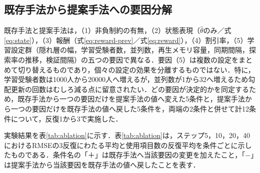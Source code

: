 \documentclass[paper]{ieicej}
\begin{document}
\subsection{既存手法から提案手法への要因分解}\label{sec:ablation}

既存手法と提案手法は，（1）非負制約の有無，（2）状態表現（$\hat\theta$のみ／式\eqref{eq:state}），（3）報酬（式\eqref{eq:reward-prev}／式\eqref{eq:reward}），（4）割引率，（5）学習設定群（隠れ層の幅，学習受験者数，並列数，再生メモリ容量，同期間隔，探索率の推移，検証間隔）の五つの要因で異なる．要因（5）は複数の設定をまとめて切り替えるものであり，個々の設定の効果を分離するものではない．特に，学習受験者数は1000人から20000人へ増えるが，並列数が1から32へ増えるため勾配更新の回数はむしろ減る点に留意されたい．どの要因が決定的かを同定するため，既存手法から一つの要因だけを提案手法の値へ変えた5条件と，提案手法から一つの要因だけを既存手法の値へ戻した5条件を，両端の2条件と併せて計12条件について，反復1から3で実施した．

実験結果を表\ref{tab:ablation}に示す．表\ref{tab:ablation}は，ステップ5，10，20，40におけるRMSEの3反復にわたる平均と使用項目数の反復平均を条件ごとに示したものである．条件名の「＋」は既存手法へ当該要因の変更を加えたこと，「−」は提案手法から当該要因を既存手法の値へ戻したことを表す．
\end{document}

